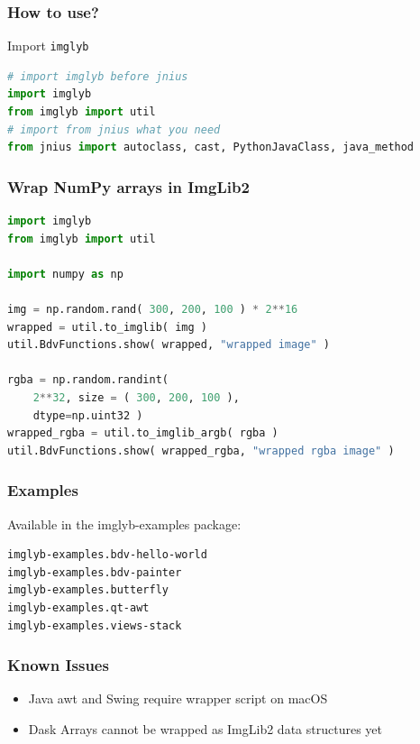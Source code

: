 \documentclass[%
]{beamer}
\begin{document}
\begin{frame}[fragile]
    \frametitle{How to use?}
Import \lstinline[language=python,basicstyle=\ttfamily\normalsize]{imglyb}
    \begin{lstlisting}[language=python]
# import imglyb before jnius
import imglyb
from imglyb import util
# import from jnius what you need
from jnius import autoclass, cast, PythonJavaClass, java_method
    \end{lstlisting}
\end{frame}

\begin{frame}[fragile]
    \frametitle{Wrap NumPy arrays in ImgLib2}
    \begin{lstlisting}[language=python]
import imglyb
from imglyb import util

import numpy as np

img = np.random.rand( 300, 200, 100 ) * 2**16
wrapped = util.to_imglib( img )
util.BdvFunctions.show( wrapped, "wrapped image" )

rgba = np.random.randint( 
    2**32, size = ( 300, 200, 100 ), 
    dtype=np.uint32 )
wrapped_rgba = util.to_imglib_argb( rgba )
util.BdvFunctions.show( wrapped_rgba, "wrapped rgba image" )
    \end{lstlisting}

\end{frame}

\begin{frame}[fragile]
    \frametitle{Examples}
    Available in the imglyb-examples package:
    \begin{lstlisting}[language=bash]
imglyb-examples.bdv-hello-world
imglyb-examples.bdv-painter
imglyb-examples.butterfly
imglyb-examples.qt-awt
imglyb-examples.views-stack
    \end{lstlisting}
\end{frame}

\begin{frame}
    \frametitle{Known Issues}
    \begin{itemize}
          \item Java awt and Swing require wrapper script on macOS
          \item Dask Arrays cannot be wrapped as ImgLib2 data structures yet
    \end{itemize}
\end{frame}
\end{document}
